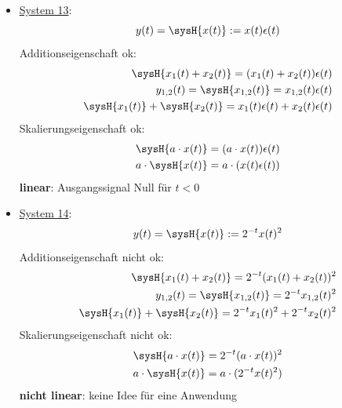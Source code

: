 \begin{Loesung}
\begin{itemize}
\item  \underline{System 13}:
\begin{equation}
y(t) = \sysH{x(t)}:= x(t) \epsilon(t)
\end{equation}
Additionseigenschaft ok:
\begin{align}
\sysH{x_1(t)+x_2(t)}= (x_1(t) + x_2(t)) \epsilon(t)\\
y_{1,2}(t) = \sysH{x_{1,2}(t)}= x_{1,2}(t)\epsilon(t)\\
\sysH{x_1(t)} + \sysH{x_2(t)} = x_1(t) \epsilon(t) + x_2(t) \epsilon(t)
\end{align}
Skalierungseigenschaft ok:
\begin{align}
\sysH{a \cdot x(t)}= (a \cdot x(t)) \epsilon(t)\\
a \cdot \sysH{x(t)}= a \cdot (x(t)\epsilon(t))
\end{align}
\textbf{linear}: Ausgangssignal Null für $t<0$

\item  \underline{System 14}:
\begin{equation}
y(t) = \sysH{x(t)}:= 2^{-t} x(t)^2
\end{equation}
Additionseigenschaft nicht ok:
\begin{align}
\sysH{x_1(t)+x_2(t)}=  2^{-t} (x_1(t)+x_2(t))^2 \\
y_{1,2}(t) = \sysH{x_{1,2}(t)}=  2^{-t} x_{1,2}(t)^2\\
\sysH{x_1(t)} + \sysH{x_2(t)} = 2^{-t} x_{1}(t)^2 + 2^{-t} x_{2}(t)^2
\end{align}
Skalierungseigenschaft nicht ok:
\begin{align}
\sysH{a \cdot x(t)}= 2^{-t} (a \cdot x(t))^2\\
a \cdot \sysH{x(t)}= a \cdot (2^{-t} x(t)^2)
\end{align}
\textbf{nicht linear}: keine Idee für eine Anwendung

\end{itemize}
\end{Loesung}

